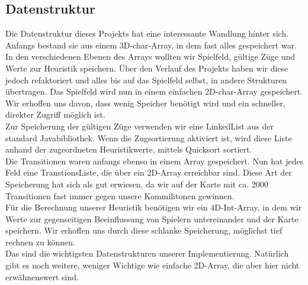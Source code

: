 \documentclass[12pt,a4paper,bibliography=totocnumbered,listof=totocnumbered]{scrartcl}
\begin{document}
	
	
	
	
	
	


    \subsection{Datenstruktur}
    \vspace{1em}
    Die Datenstruktur dieses Projekts hat eine interessante Wandlung hinter sich. Anfangs bestand sie aus einem 3D-char-Array, in dem fast alles gespeichert war. In den verschiedenen Ebenen des Arrays wollten wir Spielfeld, gültige Züge und Werte zur Heuristik speichern. Über den Verlauf des Projekts haben wir diese jedoch refaktoriert und alles bis auf das Spielfeld selbst, in andere Strukturen übertragen. Das Spielfeld wird nun in einem einfachen 2D-char-Array gespeichert. Wir erhoffen uns davon, dass wenig Speicher benötigt wird und ein schneller, direkter Zugriff möglich ist.\\
    Zur Speicherung der gültigen Züge verwenden wir eine LinkedList aus der standard Javabibliothek. Wenn die Zugsortierung aktiviert ist, wird diese Liste anhand der zugeordneten Heuristikwerte, mittels Quicksort sortiert.\\
    Die Transitionen waren anfangs ebenso in einem Array gespeichert. Nun hat jedes Feld eine \glqq TranstionsListe\grqq{}, die über ein 2D-Array erreichbar sind. Diese Art der Speicherung hat sich als gut erwiesen, da wir auf der Karte mit ca. 2000 Transitionen fast immer gegen unsere Kommilitonen gewinnen.\\
    Für die Berechnung unserer Heuristik benötigen wir ein 4D-Int-Array, in dem wir Werte zur gegenseitigen Beeinflussung von Spielern untereinander und der Karte speichern. Wir erhoffen uns durch diese \glqq schlanke\grqq{} Speicherung, möglichst tief rechnen zu können.\\
    Das sind die wichtigsten Datenstrukturen unserer Implementierung. Natürlich gibt es noch weitere, weniger Wichtige wie einfache 2D-Array, die aber hier nicht erwähnenswert sind. 
\end{document}
